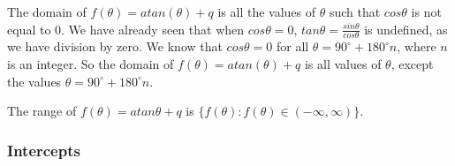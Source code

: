          
          \label{m39414*id91059}The domain of \begin{math}f\left(\theta \right)=atan\left(\theta \right)+q\end{math} is all the values of \begin{math}\theta \end{math} such that \begin{math}cos\theta \end{math} is not equal to 0. We have already seen that when \begin{math}cos\theta =0\end{math}, \begin{math}tan\theta =\frac{sin\theta }{cos\theta }\end{math} is undefined, as we have division by zero. We know that \begin{math}cos\theta =0\end{math} for all \begin{math}\theta ={90}^{\circ }+{180}^{\circ }n\end{math}, where \begin{math}n\end{math} is an integer. So the domain of \begin{math}f\left(\theta \right)=atan\left(\theta \right)+q\end{math} is all values of \begin{math}\theta \end{math}, except the values \begin{math}\theta ={90}^{\circ }+{180}^{\circ }n\end{math}.\par 
          \label{m39414*id91313}The range of \begin{math}f\left(\theta \right)=atan\theta +q\end{math} is \begin{math}\{f\left(\theta \right):f\left(\theta \right)\in \left(-\infty ,\infty \right)\}\end{math}.\par 
        
        \label{m39414*uid88}
            \subsubsection{ Intercepts}
            \nopagebreak
            
